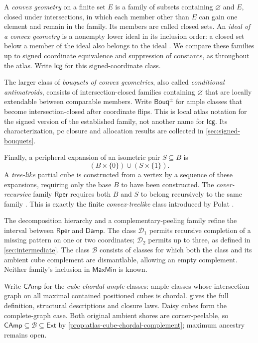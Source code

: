 \documentclass[11pt]{article}
\theoremstyle{definition}
\newcommand{\MaxMin}{\mathsf{MaxMin}}
\newcommand{\Damp}{\mathsf{Damp}}
\newcommand{\Rper}{\mathsf{Rper}}
\begin{document}
A \emph{convex geometry} on a finite set $E$ is a family of subsets containing
$\varnothing$ and $E$, closed under intersections, in which each member
other than $E$ can gain one element and remain in the family. Its members
are called closed sets. An \emph{ideal of a convex geometry} is a nonempty lower ideal in its
inclusion order: a closed set below a member of the ideal also belongs to
the ideal \cite[\S2.5]{CCKGeometry}. We compare these families up to signed
coordinate equivalence and suppression of constants, as throughout the atlas.
Write $\mathsf{Icg}$ for this signed-coordinate class.

The larger class of \emph{bouquets of convex geometries}, also called
\emph{conditional antimatroids}, consists of intersection-closed families
containing $\varnothing$ that are locally extendable between comparable
members. Write $\mathsf{Bouq}^{\pm}$ for ample classes that become
intersection-closed after coordinate flips. This is local atlas notation
for the signed version of the established family, not another name for
$\mathsf{Icg}$. Its characterization, pc closure and allocation results
are collected in \cref{sec:signed-bouquets}.


Finally, a peripheral expansion of an isometric pair $S\subseteq B$ is
\begin{equation}\label{eq:peripheral}
 (B\times\{0\})\cup(S\times\{1\}).
\end{equation}
A \emph{tree-like} partial cube is constructed from a vertex by a sequence
of these expansions, requiring only the base $B$ to have been constructed.
The \emph{cover-recursive} family $\Rper$ requires both $B$ and $S$ to belong
recursively to the same family \cite{Cover}. This is exactly the finite
\emph{convex-treelike} class introduced by Polat \cite[Definition~5.5]{Polat}.

The decomposition hierarchy and a complementary-peeling family refine the
interval between $\Rper$ and $\Damp$.
The class $\mathcal D_1$ permits recursive completion of a missing pattern
on one or two coordinates; $\mathcal D_2$ permits up to three, as
defined in \cref{sec:intermediate}.
The class $\mathcal B$ consists of classes for which both the class and
its ambient cube complement are dismantlable, allowing an empty complement.
Neither family's inclusion in $\MaxMin$ is known.

Write $\mathsf{CAmp}$ for the \emph{cube-chordal ample} classes: ample
classes whose intersection graph on all maximal contained positioned cubes
is chordal.  gives the full definition, structural
descriptions and closure laws. Daisy cubes form the complete-graph case.
Both original ambient shores are corner-peelable, so
$\mathsf{CAmp}\subseteq\mathcal B\subseteq\mathsf{Ext}$ by
\cref{prop:atlas-cube-chordal-complement}; maximum ancestry remains open.
\end{document}
